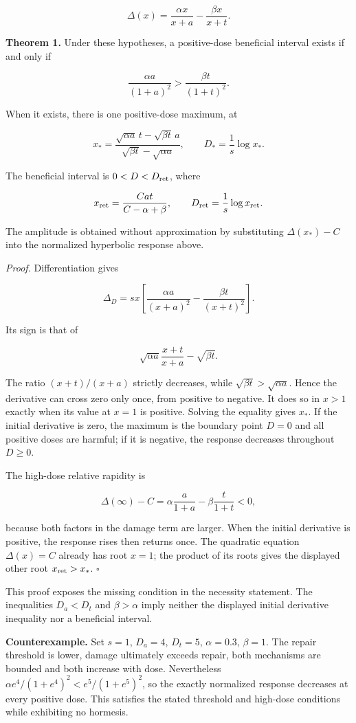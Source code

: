 \documentclass[
  11pt,
  a4paper,
]{article}
\begin{document}
\[\Delta(x)=\frac{\alpha x}{x+a}-\frac{\beta x}{x+t}.\]

\textbf{Theorem 1.} Under these hypotheses, a positive-dose beneficial interval exists if and only if

\[\frac{\alpha a}{(1+a)^2}>\frac{\beta t}{(1+t)^2}.\]

When it exists, there is one positive-dose maximum, at

\[x_*=
\frac{\sqrt{\alpha a}\,t-\sqrt{\beta t}\,a}
{\sqrt{\beta t}-\sqrt{\alpha a}},\qquad D_*=\frac1s\log x_*.\]

The beneficial interval is \(0<D<D_{\rm ret}\), where

\[x_{\rm ret}=\frac{Cat}{C-\alpha+\beta},\qquad
D_{\rm ret}=\frac1s\log x_{\rm ret}.\]

The amplitude is obtained without approximation by substituting \(\Delta(x_*)-C\) into the normalized hyperbolic response above.

\emph{Proof.} Differentiation gives

\[\Delta_D=sx\left[\frac{\alpha a}{(x+a)^2}
-\frac{\beta t}{(x+t)^2}\right].\]

Its sign is that of

\[\sqrt{\alpha a}\frac{x+t}{x+a}-\sqrt{\beta t}.\]

The ratio \((x+t)/(x+a)\) strictly decreases, while \(\sqrt{\beta t}>\sqrt{\alpha a}\). Hence the derivative can cross zero only once, from positive to negative. It does so in \(x>1\) exactly when its value at \(x=1\) is positive. Solving the equality gives \(x_*\). If the initial derivative is zero, the maximum is the boundary point \(D=0\) and all positive doses are harmful; if it is negative, the response decreases throughout \(D\ge0\).

The high-dose relative rapidity is

\[\Delta(\infty)-C
=\alpha\frac a{1+a}-\beta\frac t{1+t}<0,\]

because both factors in the damage term are larger. When the initial derivative is positive, the response rises then returns once. The quadratic equation \(\Delta(x)=C\) already has root \(x=1\); the product of its roots gives the displayed other root \(x_{\rm ret}>x_*\). \(\square\)

This proof exposes the missing condition in the necessity statement. The inequalities \(D_a<D_t\) and \(\beta>\alpha\) imply neither the displayed initial derivative inequality nor a beneficial interval.

\textbf{Counterexample.} Set \(s=1\), \(D_a=4\), \(D_t=5\), \(\alpha=0.3\), \(\beta=1\). The repair threshold is lower, damage ultimately exceeds repair, both mechanisms are bounded and both increase with dose. Nevertheless \(\alpha e^4/(1+e^4)^2<e^5/(1+e^5)^2\), so the exactly normalized response decreases at every positive dose. This satisfies the stated threshold and high-dose conditions while exhibiting no hormesis.
\end{document}
